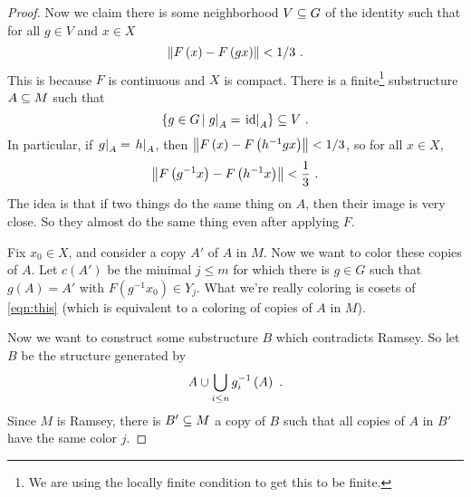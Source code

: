 \documentclass{amsart}
\begin{document}
\begin{proof}
Now we claim there is some neighborhood $V\subseteq G$ of the identity 
such that for all $g\in V$ and $x\in X$ 
\begin{equation}
\left\lVert F\left( x \right) - F\left( gx \right) \right\rVert < 1/3 \ .
\end{equation}
This is because $F$ is continuous and $X$ is compact.
There is a finite\footnote{We are using the locally finite condition to get this to be
finite.} substructure $A\subseteq M$ such that
\begin{equation}
\left\{ g\in G \, \middle\vert \, \left.g \right\vert_{A} = \left.\operatorname{id} \right\vert_{A} \right\}\subseteq V \ .
\label{eqn:this}
\end{equation}
In particular, if $\left.g \right\vert_{A} = \left.h \right\vert_{A}$, then $\left\lVert F\left( x \right) - F\left(
h^{-1} g x \right) \right\rVert < 1/3$, so for all $x\in X$, 
\begin{equation}
\left\lVert F\left( g^{-1} x \right) - F\left( h^{-1} x \right) \right\rVert < \frac{1}{3} \ .
\end{equation}
The idea is that if two things do the same thing on $A$, then their image is very close. 
So they almost do the same thing even after applying $F$.

Fix $x_0\in X$, and consider a copy $A'$ of $A$ in $M$. 
Now we want to color these copies of $A$. Let $c\left( A' \right)$ be the minimal $j\leq
m$ for which there is $g\in G$ such that $g\left( A \right) = A'$ with $F\left( g^{-1} x_0
\right)\in Y_j$. 
What we're really coloring is cosets of
\eqref{eqn:this} (which is equivalent to
a coloring of copies of $A$ in $M$).

Now we want to construct some substructure $B$ which contradicts Ramsey.
So let $B$ be the structure generated by
\begin{equation}
A\cup \bigcup_{i\leq n} g_i^{-1}\left( A \right) \ .
\end{equation}
Since $M$ is Ramsey, there is $B'\subseteq M$ a copy of $B$ such that all copies of $A$ in
$B'$ have the same color $j$. 


\end{proof}
\end{document}
